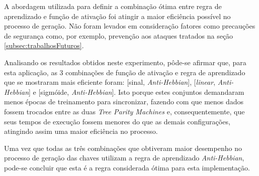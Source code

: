 \documentclass[12pt]{article}
\begin{document}
                
                
                
                
            
                

                A abordagem utilizada para definir a combinação ótima entre regra de aprendizado e função de ativação foi atingir a maior eficiência possível no processo de geração. Não foram levados em consideração fatores como precauções de segurança como, por exemplo, prevenção aos ataques tratados na seção \ref{subsec:trabalhosFuturos}.
                
                Analisando os resultados obtidos neste experimento, pôde-se afirmar que, para esta aplicação, as 3 combinações de função de ativação e regra de aprendizado que se mostraram mais eficiente foram: [sinal, \textit{Anti-Hebbian}], [\textit{linear}, \textit{Anti-Hebbian}] e [sigmóide, \textit{Anti-Hebbian}]. Isto porque estes conjuntos demandaram menos épocas de treinamento para sincronizar, fazendo com que menos dados fossem trocados entre as duas \textit{Tree Parity Machines} e, consequentemente, que seus tempos de execução fossem menores do que as demais configurações, atingindo assim uma maior eficiência no processo.
                
                Uma vez que todas as três combinações que obtiveram maior desempenho no processo de geração das chaves utilizam a regra de aprendizado \textit{Anti-Hebbian}, pode-se concluir que esta é a regra considerada ótima para esta implementação.
            
\end{document}
